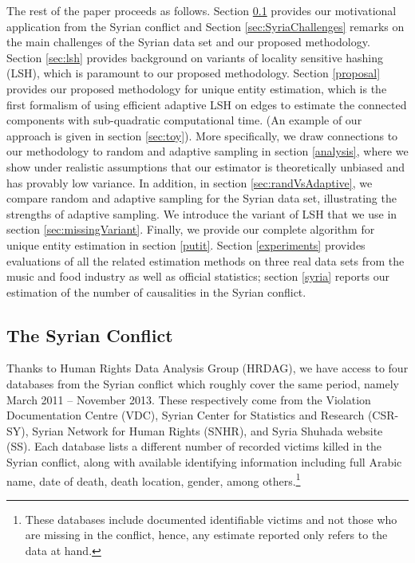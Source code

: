 \documentclass[aoas]{imsart}
\begin{document}
The rest of the paper proceeds as follows. Section \ref{syriadata} provides our motivational application from the Syrian conflict 
and Section \ref{sec:SyriaChallenges} remarks on the main challenges of the Syrian data set and our proposed methodology. Section \ref{sec:lsh} provides background on variants of locality sensitive hashing (LSH), which is paramount to our proposed methodology.  Section \ref{proposal} provides our proposed methodology for unique entity estimation, which is the first formalism of using efficient adaptive LSH on edges to estimate the connected components with sub-quadratic computational time. (An example of our approach is given in section \ref{sec:toy}). More specifically, we draw connections to our methodology to random and adaptive sampling in section \ref{analysis}, where we show under realistic assumptions that our estimator is theoretically unbiased and has provably low variance. In addition, in section \ref{sec:randVsAdaptive}, we compare random and adaptive sampling for the Syrian data set, illustrating the strengths of adaptive sampling. We introduce the variant of LSH that we use in section \ref{sec:missingVariant}. Finally, we provide our complete algorithm for unique entity estimation in section \ref{putit}. 
Section \ref{experiments} provides evaluations of all the related estimation methods on three real data sets from the music and food industry as well as official statistics; section \ref{syria} reports our estimation of the number of causalities in the Syrian conflict.

\subsection{The Syrian Conflict}
\label{syriadata}
Thanks to Human Rights Data Analysis Group (HRDAG), we have access to four databases from the Syrian conflict which roughly cover the same period, namely March 2011 -- November 2013. These respectively come from the Violation Documentation Centre (VDC), Syrian Center for Statistics and Research (CSR-SY), Syrian Network for Human Rights (SNHR), and Syria Shuhada website (SS). Each database lists a different number of recorded victims killed in the Syrian conflict, along with available identifying information including full Arabic name, date of death, death location, gender, among others.\footnote{These databases include documented identifiable victims and not those who are missing in the conflict, hence, any estimate reported only refers to the data at hand.}

\end{document}
